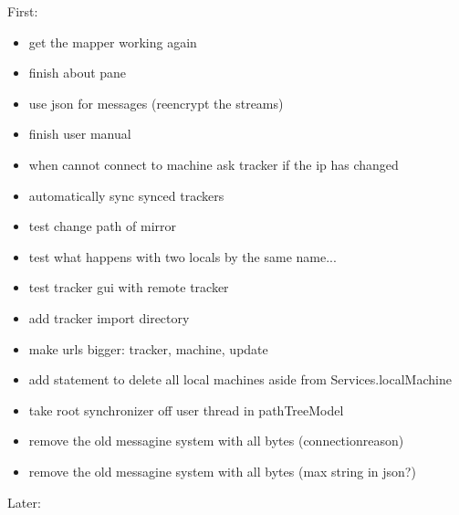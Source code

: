 \documentclass{article}
\begin{document}
First:
\begin{itemize}
\item get the mapper working again
\item finish about pane
\item use json for messages (reencrypt the streams)
\item finish user manual
\item when cannot connect to machine ask tracker if the ip has changed
\item automatically sync synced trackers
\item test change path of mirror
\item test what happens with two locals by the same name...
\item test tracker gui with remote tracker
\item add tracker import directory
\item make urls bigger: tracker, machine, update
\item add statement to delete all local machines aside from Services.localMachine
\item take root synchronizer off user thread in pathTreeModel
\item remove the old messagine system with all bytes (connectionreason)
\item remove the old messagine system with all bytes (max string in json?)
\end{itemize}
Later:
\end{document}
